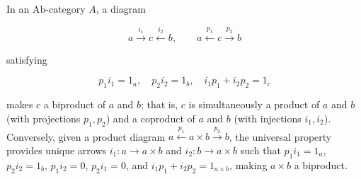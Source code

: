 In an $\text{Ab}$-category $A$, a diagram

$$a \xrightarrow{i_1} c \xleftarrow{i_2} b, \qquad a \xleftarrow{p_1} c \xrightarrow{p_2} b$$

satisfying

$$p_1 i_1 = 1_a, \quad p_2 i_2 = 1_b, \quad i_1 p_1 + i_2 p_2 = 1_c$$

makes $c$ a biproduct of $a$ and $b$; that is, $c$ is simultaneously a product of $a$ and $b$ (with projections $p_1, p_2$) and a coproduct of $a$ and $b$ (with injections $i_1, i_2$). Conversely, given a product diagram $a \xleftarrow{p_1} a \times b \xrightarrow{p_2} b$, the universal property provides unique arrows $i_1 : a \rightarrow a \times b$ and $i_2 : b \rightarrow a \times b$ such that $p_1 i_1 = 1_a$, $p_2 i_2 = 1_b$, $p_1 i_2 = 0$, $p_2 i_1 = 0$, and $i_1 p_1 + i_2 p_2 = 1_{a \times b}$, making $a \times b$ a biproduct.
